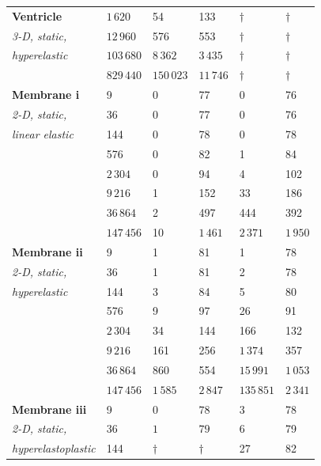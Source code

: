 \documentclass[sn-mathphys,Numbered]{sn-jnl}%
\begin{document}
\begin{table}[!htbp]
\begin{tabular}{ll|ll|ll}
			\textbf{Ventricle} & $1\,620$ & 54 & 133 				& $\dag$ & $\dag$  \\ %
			\emph{3-D, static,}& $12\,960$ & 576 & 553 			& $\dag$  & $\dag$ \\ %
			\emph{hyperelastic} & $103\,680$ & $8\,362$ & $3\,435$ 	& $\dag$  & $\dag$ \\ %
				& $829\,440$ & $150\,023$ & $11\,746$ 			& $\dag$  & $\dag$ \\ %
			\hline
			\textbf{Membrane i} & 9 & 0 & 77 	& 0 & 76 \\
			\emph{2-D, static,}& 36 & 0 & 77  	& 0 & 76 \\
			\emph{linear elastic}& 144 & 0 & 78  & 0 & 78 \\
				& 576 & 0 & 82 				& 1 & 84 \\
				& $2\,304$ & 0 & 94 			& 4 & 102 \\
				& $9\,216$ & 1 & 152 		& 33 & 186 \\
				& $36\,864$ & 2& 497 		& 444 & 392 \\
				& $147\,456$ & 10& $1\,461$ 	& $2\,371$ & $1\,950$ \\
			\hline
			\textbf{Membrane ii} & 9 	& 1 & 81 		& 1 & 78 \\
			\emph{2-D, static,} & 36 	& 1& 81 		& 2 & 78 \\
			\emph{hyperelastic} & 144 & 3 & 84 		& 5 & 80 \\
				& 576 			& 9 & 97 		& 26 & 91 \\
				& $2\,304$ 		& 34 & 144 	& 166 & 132  \\
				& $9\,216$ 		& 161 & 256  	& $1\,374$ & 357 \\
				& $36\,864$ 		& 860 & 554  	& $15\,991$ & $1\,053$ \\
				& $147\,456$ 		& $1\,585$ & $2\,847$ & $135\,851$ & $2\,341$ \\
			\hline
			\textbf{Membrane iii} & 9 & $0$ & $78$	& 3 & 78 \\
			\emph{2-D, static,} & 36 & $1$ & $79$	& 6 & 79 \\
			\emph{hyperelastoplastic}& 144 & $\dag$ & $\dag$	& 27 & 82 \\

\end{tabular}
\end{table}
\end{document}
